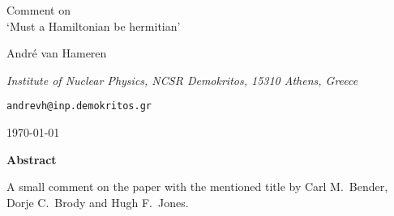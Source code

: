 \documentclass[a4paper,12pt]{article}
\renewcommand{\baselinestretch}{1.1}
\begin{document}
% 
\begin{center}
%
{\Huge Comment on}\\\vspace{0.5\baselineskip}
{\Huge `Must a Hamiltonian be hermitian'}

\vspace{2\baselineskip}%
{\Large Andr\'e van Hameren%
}

\vspace{0.25\baselineskip}%
{\it\large Institute of Nuclear Physics, NCSR Demokritos, 15310 Athens, Greece}

\vspace{0.25\baselineskip}%
{\tt\large andrevh@inp.demokritos.gr}

\vspace{0.25\baselineskip}%
{\large\today}

\renewcommand{\baselinestretch}{1}
\vspace{2\baselineskip}%
{\bf Abstract}\\\vspace{0.5\baselineskip}
\parbox{0.8\linewidth}{\small\hspace{15pt}%
A small comment on the paper with the mentioned title by Carl M.\ Bender, Dorje C.\ Brody and Hugh F.\ Jones.
%
}
\end{center}
\vspace{\baselineskip}
\end{document}
